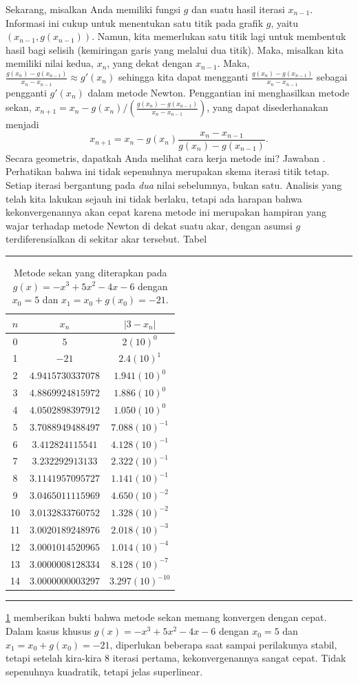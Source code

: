 Sekarang, misalkan Anda memiliki fungsi $g$ dan suatu hasil iterasi
$x_{n-1}$. Informasi ini cukup untuk menentukan satu titik pada grafik
$g$, yaitu $(x_{n-1},g(x_{n-1}))$. Namun, kita memerlukan satu titik
lagi untuk membentuk hasil bagi selisih (kemiringan garis yang melalui
dua titik). Maka, misalkan kita memiliki nilai kedua, $x_{n}$, yang
dekat dengan $x_{n-1}$. Maka, $\frac{g(x_{n})-g(x_{n-1})}{x_{n}-x_{n-1}}\approx g'(x_{n})$
sehingga kita dapat mengganti $\frac{g(x_{n})-g(x_{n-1})}{x_{n}-x_{n-1}}$
sebagai pengganti $g'(x_{n})$ dalam metode Newton. Penggantian ini
menghasilkan  metode sekan, $x_{n+1}=x_{n}-g(x_{n})/\left(\frac{g(x_{n})-g(x_{n-1})}{x_{n}-x_{n-1}}\right)$,
yang dapat disederhanakan menjadi
\begin{equation}
x_{n+1}=x_{n}-g(x_{n})\frac{x_{n}-x_{n-1}}{g(x_{n})-g(x_{n-1})}.\label{eq:secantMethod}
\end{equation}
Secara geometris, dapatkah Anda melihat cara kerja metode ini? Jawaban
. Perhatikan bahwa ini tidak
sepenuhnya merupakan skema iterasi titik tetap. Setiap iterasi bergantung
pada \textit{dua} nilai sebelumnya, bukan satu. Analisis yang telah
kita lakukan sejauh ini tidak berlaku, tetapi ada harapan bahwa kekonvergenannya
akan cepat karena metode ini merupakan hampiran yang wajar terhadap
metode Newton di dekat suatu akar, dengan asumsi $g$ terdiferensialkan
di sekitar akar tersebut. Tabel 
\begin{table}
\hrule 

\caption{\label{tab:secantDemo} Metode sekan yang diterapkan pada $g(x)=-x^{3}+5x^{2}-4x-6$
dengan $x_{0}=5$ dan $x_{1}=x_{0}+g(x_{0})=-21$.}

\centering{}\medskip{}
\begin{tabular}{ccc}
$n$ & $x_{n}$ & $|3-x_{n}|$\tabularnewline
\hline 
0 & $5$ & $2(10)^{0}$\tabularnewline
1 & $-21$ & $2.4(10)^{1}$\tabularnewline
2 & $4.9415730337078$ & $1.941(10)^{0}$\tabularnewline
3 & $4.8869924815972$ & $1.886(10)^{0}$\tabularnewline
4 & $4.0502898397912$ & $1.050(10)^{0}$\tabularnewline
5 & $3.7088949488497$ & $7.088(10)^{-1}$\tabularnewline
6 & $3.412824115541$ & $4.128(10)^{-1}$\tabularnewline
7 & $3.232292913133$ & $2.322(10)^{-1}$\tabularnewline
8 & $3.1141957095727$ & $1.141(10)^{-1}$\tabularnewline
9 & $3.0465011115969$ & $4.650(10)^{-2}$\tabularnewline
10 & $3.0132833760752$ & $1.328(10)^{-2}$\tabularnewline
11 & $3.0020189248976$ & $2.018(10)^{-3}$\tabularnewline
12 & $3.0001014520965$ & $1.014(10)^{-4}$\tabularnewline
13 & $3.0000008128334$ & $8.128(10)^{-7}$\tabularnewline
14 & $3.0000000003297$ & $3.297(10)^{-10}$\tabularnewline
\end{tabular}\medskip{}
\hrule 
\end{table}
\ref{tab:secantDemo} memberikan bukti bahwa metode sekan memang konvergen
dengan cepat. Dalam kasus khusus $g(x)=-x^{3}+5x^{2}-4x-6$ dengan
$x_{0}=5$ dan $x_{1}=x_{0}+g(x_{0})=-21$, diperlukan beberapa saat
sampai perilakunya stabil, tetapi setelah kira-kira 8 iterasi pertama,
kekonvergenannya sangat cepat. Tidak sepenuhnya kuadratik, tetapi
jelas superlinear.

